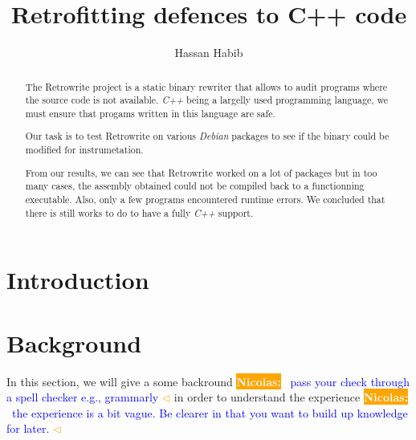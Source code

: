 \documentclass[a4paper,11pt,oneside]{report}
\title{Retrofitting defences to C++ code}
\author{Hassan Habib}
\newcommand{\sysname}{Retrowrite\xspace}
\newcommand{\todobox}[3]{%
    \colorbox{#1}{\textcolor{white}{\sffamily\bfseries\scriptsize #2}}%
    ~\textcolor{blue}{#3} %
    \textcolor{#1}{$\triangleleft$}%
}
\newcommand{\nb}[1]{\todobox{orange}{Nicolas:}{#1}}
\begin{document}
\maketitle

\begin{abstract}
The \sysname project is a static binary rewriter that allows to audit programs where the
source code is not available.
\textit{C++} being a largelly used programming language, we must ensure that
progams written in this language are safe. 

Our task is to test \sysname on various \textit{Debian} packages to see if the
binary could be modified for instrumetation.

From our results, we can see that \sysname worked on a lot of packages but in
too many cases, the assembly obtained could not be compiled back to a
functionning executable. Also, only a few programs encountered runtime errors.
We concluded that there is still works to do to have a fully \textit{C++} support.

\end{abstract}


\maketoc

\chapter{Introduction}

%

\chapter{Background}
In this section, we will give a some backround \nb{pass your check
through a spell checker e.g., grammarly} in order to understand
the experience \nb{the experience is a bit vague. Be clearer in that you want to
build up knowledge for later.}
\end{document}
